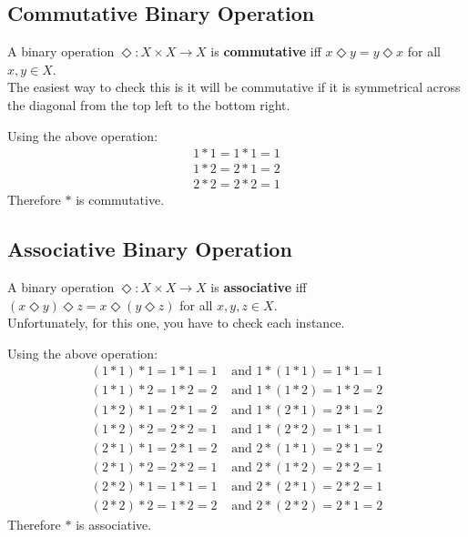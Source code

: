 \documentclass[../notes.tex]{subfiles}
\begin{document}
			\subsection{Commutative Binary Operation}
				A binary operation $\Diamond: X \times X \rightarrow X$ is \textbf{commutative} iff $x \Diamond y = y \Diamond x$ for all $x, y \in X$.\\
				The easiest way to check this is it will be commutative if it is symmetrical across the diagonal from the top left to the bottom right.
				\begin{example}
					Using the above operation:
					\begin{align*}
						1 * 1 = 1 * 1 = 1\\
						1 * 2 = 2 * 1 = 2\\
						2 * 2 = 2 * 2 = 1
					\end{align*}
					Therefore $*$ is commutative.
				\end{example}
			\subsection{Associative Binary Operation}
				A binary operation $\Diamond: X \times X \rightarrow X$ is \textbf{associative} iff $(x \Diamond y) \Diamond z = x \Diamond (y \Diamond z)$ for all $x, y, z \in X$.\\
				Unfortunately, for this one, you have to check each instance.
				\begin{example}
					Using the above operation:
					\begin{align*}
						(1 * 1) * 1 = 1 * 1 = 1 &\text{ and } 1 * (1 * 1) = 1 * 1 = 1\\
						(1 * 1) * 2 = 1 * 2 = 2 &\text{ and } 1 * (1 * 2) = 1 * 2 = 2\\
						(1 * 2) * 1 = 2 * 1 = 2 &\text{ and } 1 * (2 * 1) = 2 * 1 = 2\\
						(1 * 2) * 2 = 2 * 2 = 1 &\text{ and } 1 * (2 * 2) = 1 * 1 = 1\\
						(2 * 1) * 1 = 2 * 1 = 2 &\text{ and } 2 * (1 * 1) = 2 * 1 = 2\\
						(2 * 1) * 2 = 2 * 2 = 1 &\text{ and } 2 * (1 * 2) = 2 * 2 = 1\\
						(2 * 2) * 1 = 1 * 1 = 1 &\text{ and } 2 * (2 * 1) = 2 * 2 = 1\\
						(2 * 2) * 2 = 1 * 2 = 2 &\text{ and } 2 * (2 * 2) = 2 * 1 = 2
					\end{align*}
					Therefore $*$ is associative.
				\end{example}
			\pagebreak
\end{document}
